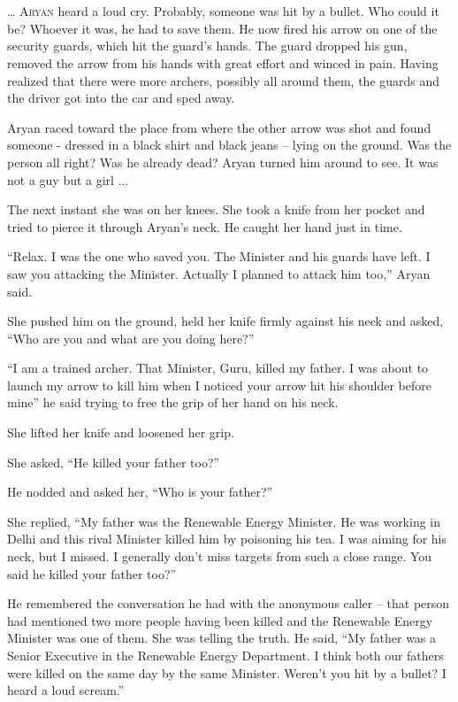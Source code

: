 \chapter{}

\lettrine{…}{ Aryan} heard a loud cry. Probably, someone was hit by a bullet. Who could it
be? Whoever it was, he had to save them. He now fired his arrow on one of the
security guards, which hit the guard's hands. The guard dropped his gun, removed
the arrow from his hands with great effort and winced in pain. Having realized
that there were more archers, possibly all around them, the guards and the
driver got into the car and sped away.

Aryan raced toward the place from where the other arrow was shot and found
someone - dressed in a black shirt and black jeans – lying on the ground. Was
the person all right? Was he already dead? Aryan turned him around to see. It
was not a guy but a girl ...

The next instant she was on her knees. She took a knife from her pocket and
tried to pierce it through Aryan's neck. He caught her hand just in time.

“Relax. I was the one who saved you. The Minister and his guards have left. I
saw you attacking the Minister. Actually I planned to attack him too,” Aryan
said.

She pushed him on the ground, held her knife firmly against his neck and asked,
“Who are you and what are you doing here?”

“I am a trained archer. That Minister, Guru, killed my father. I was about to
launch my arrow to kill him when I noticed your arrow hit his shoulder before
mine” he said trying to free the grip of her hand on his neck.

She lifted her knife and loosened her grip.

She asked, “He killed your father too?”

He nodded and asked her, “Who is your father?”

She replied, “My father was the Renewable Energy Minister. He was working in
Delhi and this rival Minister killed him by poisoning his tea. I was aiming for
his neck, but I missed. I generally don't miss targets from such a close range.
You said he killed your father too?”

He remembered the conversation he had with the anonymous caller – that person
had mentioned two more people having been killed and the Renewable Energy
Minister was one of them. She was telling the truth. He said, “My father was a
Senior Executive in the Renewable Energy Department. I think both our fathers
were killed on the same day by the same Minister. Weren't you hit by a bullet? I
heard a loud scream.”

